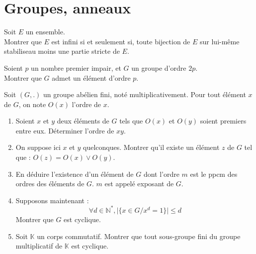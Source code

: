 \section{Groupes, anneaux}

\begin{exer}
Soit $E$ un ensemble.\\
Montrer que $E$ est infini si et seulement si, toute bijection de $E$ sur lui-même stabiliseau moins une partie stricte de $E$.
\end{exer}

\begin{exer}
Soient $p$ un nombre premier impair, et $G$ un groupe d'ordre $2p$.\\
Montrer que $G$ admet un élément d'ordre $p$.
\end{exer}

\begin{exer}
Soit $(G,.)$ un groupe abélien fini, noté multiplicativement. Pour tout élément $x$ de $G$, on note $O(x)$ l'ordre de $x$.
\begin{enumerate}
\item Soient $x$ et $y$ deux éléments de $G$ tels que $O(x)$ et $O(y)$ soient premiers entre eux. Déterminer l'ordre de $xy$.
\item On suppose ici $x$ et $y$ quelconques. Montrer qu'il existe un élément $z$ de $G$ tel que : $O(z) = O(x) \vee O(y)$.
\item En déduire l'existence d'un élément de $G$ dont l'ordre $m$ est le ppcm des ordres des éléments de $G$. %
$m$ est appelé exposant de $G$.
\item Supposons maintenant :\[\forall d \in \mathbb{N}^{\ast} , \lvert \{ x \in G / x^d = 1 \} \rvert \leqslant d\]
Montrer que $G$ est cyclique.
\item Soit $\mathbb{K}$ un corps commutatif. Montrer que %
tout sous-groupe fini du groupe multiplicatif de $\mathbb{K}$ est cyclique.
\end{enumerate}
\end{exer}

